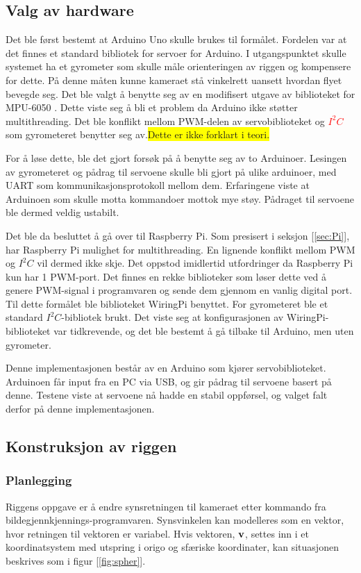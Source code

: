 \subsection{Valg av hardware}

Det ble først bestemt at Arduino Uno skulle brukes til formålet. Fordelen var at det finnes et standard bibliotek for servoer for Arduino. I utgangspunktet skulle systemet ha et gyrometer som skulle måle orienteringen av riggen og kompensere for dette. På denne måten kunne kameraet stå vinkelrett uansett hvordan flyet bevegde seg. Det ble valgt å benytte seg av en modifisert utgave av biblioteket for MPU-6050 \cite{GyroLib}. Dette viste seg å bli et problem da Arduino ikke støtter multithreading. Det ble konflikt mellom PWM-delen av servobiblioteket og \textcolor{red}{$I^2C$} som gyrometeret benytter seg av.\colorbox{yellow}{Dette er ikke forklart i teori.}

For å løse dette, ble det gjort forsøk på å benytte seg av to Arduinoer. Lesingen av gyrometeret og pådrag til servoene skulle bli gjort på ulike arduinoer, med UART som kommunikasjonsprotokoll mellom dem. Erfaringene viste at Arduinoen som skulle motta kommandoer mottok mye støy. Pådraget til servoene ble dermed veldig ustabilt.

Det ble da besluttet å gå over til Raspberry Pi. Som presisert i seksjon [\ref{sec:Pi}], har Raspberry Pi mulighet for multithreading. En lignende konflikt mellom PWM og $I^2C$ vil dermed ikke skje. Det oppstod imidlertid utfordringer da Raspberry Pi kun har 1 PWM-port. Det finnes en rekke biblioteker som løser dette ved å genere PWM-signal i programvaren og sende dem gjennom en vanlig digital port. Til dette formålet ble biblioteket WiringPi \cite{WirPi} benyttet. For gyrometeret ble et standard $I^2C$-bibliotek brukt. Det viste seg at konfigurasjonen av WiringPi-biblioteket var tidkrevende, og det ble bestemt å gå tilbake til Arduino, men uten gyrometer.

Denne implementasjonen består av en Arduino som kjører servobiblioteket. Arduinoen får input fra en PC via USB, og gir pådrag til servoene basert på denne. Testene viste at servoene nå hadde en stabil oppførsel, og valget falt derfor på denne implementasjonen.

\subsection{Konstruksjon av riggen}

\subsubsection{Planlegging}
Riggens oppgave er å endre synsretningen til kameraet etter kommando fra bildegjennkjennings-programvaren. Synsvinkelen kan modelleres som en vektor, hvor retningen til vektoren er variabel. Hvis vektoren, $\bf{v}$, settes inn i et koordinatsystem med utspring i origo og sfæriske koordinater, kan situasjonen beskrives som i figur [\ref{fig:spher}].

